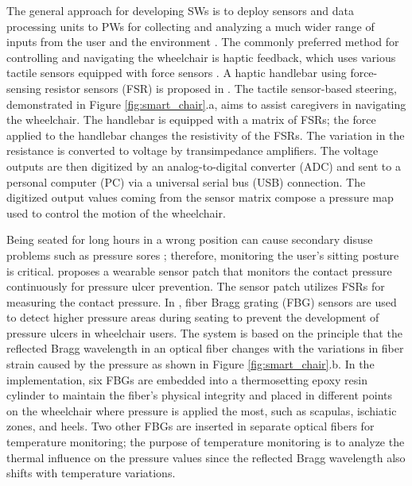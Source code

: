 The general approach for developing SWs is to deploy sensors and data processing units to PWs for collecting and analyzing a much wider range of inputs from the user and the environment \parencite{leaman_comprehensive_2017}. The commonly preferred method for controlling and navigating the wheelchair is haptic feedback, which uses various tactile sensors equipped with force sensors \parencite{hadj-abdelkader_haptic_2012,morere_haptic_2015,poorten_powered_2012,trujillo-leon_tactile_2018}. A haptic handlebar using force-sensing resistor sensors (FSR) is proposed in \textcite{trujillo-leon_tactile_2018}. The tactile sensor-based steering, demonstrated in Figure \ref{fig:smart_chair}.a, aims to assist caregivers in navigating the wheelchair. The handlebar is equipped with a matrix of FSRs; the force applied to the handlebar changes the resistivity of the FSRs. The variation in the resistance is converted to voltage by transimpedance amplifiers. The voltage outputs are then digitized by an analog-to-digital converter (ADC) and sent to a personal computer (PC) via a universal serial bus (USB) connection. The digitized output values coming from the sensor matrix compose a pressure map used to control the motion of the wheelchair. 

Being seated for long hours in a wrong position can cause secondary disuse problems such as pressure sores \parencite{redford_seating_1993}; therefore, monitoring the user's sitting posture is critical. \textcite{sen_wireless_2018} proposes a wearable sensor patch that monitors the contact pressure continuously for pressure ulcer prevention. The sensor patch utilizes FSRs for measuring the contact pressure. In \textcite{tavares_wheelchair_2020}, fiber Bragg grating (FBG) sensors are used to detect higher pressure areas during seating to prevent the development of pressure ulcers in wheelchair users. The system is based on the principle that the reflected Bragg wavelength in an optical fiber changes with the variations in fiber strain caused by the pressure as shown in Figure \ref{fig:smart_chair}.b. In the implementation, six FBGs are embedded into a thermosetting epoxy resin cylinder to maintain the fiber's physical integrity and placed in different points on the wheelchair where pressure is applied the most, such as scapulas, ischiatic zones, and heels. Two other FBGs are inserted in separate optical fibers for temperature monitoring; the purpose of temperature monitoring is to analyze the thermal influence on the pressure values since the reflected Bragg wavelength also shifts with temperature variations. 

